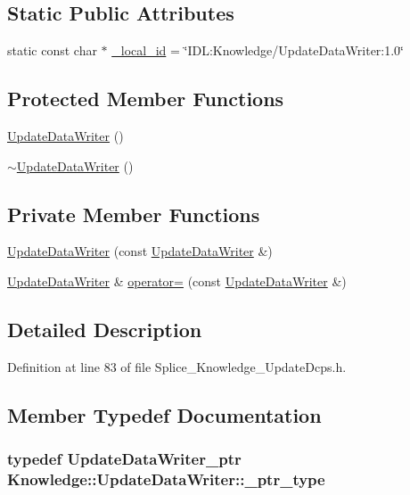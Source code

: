 \subsection*{Static Public Attributes}
\begin{DoxyCompactItemize}
\item 
static const char $\ast$ \hyperlink{classKnowledge_1_1UpdateDataWriter_a595ca0d99b00834ed9c834535e34c224}{\_\-local\_\-id} = \char`\"{}IDL:Knowledge/UpdateDataWriter:1.0\char`\"{}
\end{DoxyCompactItemize}
\subsection*{Protected Member Functions}
\begin{DoxyCompactItemize}
\item 
\hyperlink{classKnowledge_1_1UpdateDataWriter_a847955162d25c8e5487bb8847ed24814}{UpdateDataWriter} ()
\item 
\hyperlink{classKnowledge_1_1UpdateDataWriter_a2cf3ca494a3edf43886a8286195483fc}{$\sim$UpdateDataWriter} ()
\end{DoxyCompactItemize}
\subsection*{Private Member Functions}
\begin{DoxyCompactItemize}
\item 
\hyperlink{classKnowledge_1_1UpdateDataWriter_afe29238dafda346c3a734e048dbcfc1b}{UpdateDataWriter} (const \hyperlink{classKnowledge_1_1UpdateDataWriter}{UpdateDataWriter} \&)
\item 
\hyperlink{classKnowledge_1_1UpdateDataWriter}{UpdateDataWriter} \& \hyperlink{classKnowledge_1_1UpdateDataWriter_abf983a2fc0b12452f80d373655147cfd}{operator=} (const \hyperlink{classKnowledge_1_1UpdateDataWriter}{UpdateDataWriter} \&)
\end{DoxyCompactItemize}


\subsection{Detailed Description}


Definition at line 83 of file Splice\_\-Knowledge\_\-UpdateDcps.h.



\subsection{Member Typedef Documentation}
\hypertarget{classKnowledge_1_1UpdateDataWriter_aa60c888db648c0f608ef197ead80c9a6}{
\subsubsection[{\_\-ptr\_\-type}]{\setlength{\rightskip}{0pt plus 5cm}typedef {\bf UpdateDataWriter\_\-ptr} {\bf Knowledge::UpdateDataWriter::\_\-ptr\_\-type}}}
\label{d9/dbb/classKnowledge_1_1UpdateDataWriter_aa60c888db648c0f608ef197ead80c9a6}


